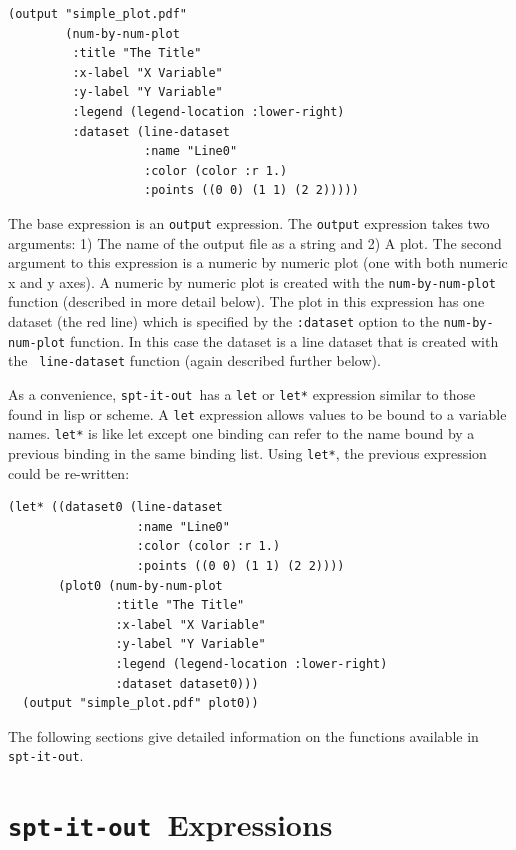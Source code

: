 \documentclass{article}
\newcommand{\sio}{{\tt spt-it-out}}
\begin{document}
\begin{verbatim}
(output "simple_plot.pdf"
        (num-by-num-plot
         :title "The Title"
         :x-label "X Variable"
         :y-label "Y Variable"
         :legend (legend-location :lower-right)
         :dataset (line-dataset
                   :name "Line0"
                   :color (color :r 1.)
                   :points ((0 0) (1 1) (2 2)))))
\end{verbatim}

The base expression is an {\tt output} expression.  The {\tt output}
expression takes two arguments: 1) The name of the output file as a
string and 2) A plot.  The second argument to this expression is a
numeric by numeric plot (one with both numeric x and y axes).  A
numeric by numeric plot is created with the {\tt num-by-num-plot}
function (described in more detail below).  The plot in this
expression has one dataset (the red line) which is specified by the
{\tt :dataset} option to the {\tt num-by-num-plot} function.  In this
case the dataset is a line dataset that is created with the {\tt
  line-dataset} function (again described further below).

As a convenience, \sio\ has a {\tt let} or {\tt let*} expression
similar to those found in lisp or scheme.  A {\tt let} expression
allows values to be bound to a variable names.  {\tt let*} is like let
except one binding can refer to the name bound by a previous binding
in the same binding list.  Using {\tt let*}, the previous expression
could be re-written:

\begin{verbatim}
(let* ((dataset0 (line-dataset
                  :name "Line0"
                  :color (color :r 1.)
                  :points ((0 0) (1 1) (2 2))))
       (plot0 (num-by-num-plot
               :title "The Title"
               :x-label "X Variable"
               :y-label "Y Variable"
               :legend (legend-location :lower-right)
               :dataset dataset0)))
  (output "simple_plot.pdf" plot0))
\end{verbatim}

The following sections give detailed information on the functions
available in \sio.

\section{\sio\ Expressions}
\end{document}
